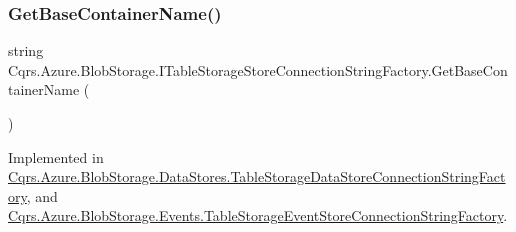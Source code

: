 \subsubsection{\texorpdfstring{Get\+Base\+Container\+Name()}{GetBaseContainerName()}}
{\footnotesize\ttfamily string Cqrs.\+Azure.\+Blob\+Storage.\+I\+Table\+Storage\+Store\+Connection\+String\+Factory.\+Get\+Base\+Container\+Name (\begin{DoxyParamCaption}{ }\end{DoxyParamCaption})}



Implemented in \hyperlink{classCqrs_1_1Azure_1_1BlobStorage_1_1DataStores_1_1TableStorageDataStoreConnectionStringFactory_a03239d850e3fd95cd1507780425a7c94_a03239d850e3fd95cd1507780425a7c94}{Cqrs.\+Azure.\+Blob\+Storage.\+Data\+Stores.\+Table\+Storage\+Data\+Store\+Connection\+String\+Factory}, and \hyperlink{classCqrs_1_1Azure_1_1BlobStorage_1_1Events_1_1TableStorageEventStoreConnectionStringFactory_a118388598a7fa653122fc11521c915d7_a118388598a7fa653122fc11521c915d7}{Cqrs.\+Azure.\+Blob\+Storage.\+Events.\+Table\+Storage\+Event\+Store\+Connection\+String\+Factory}.


